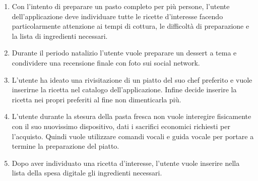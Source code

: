 \begin{enumerate}
\label{tasks}
\item Con l'intento di preparare un pasto completo per più persone,
l'utente dell'applicazione deve individuare tutte le ricette d'interesse
facendo particolarmente attenzione ai tempi di cottura, le difficoltà di
preparazione e la lista di ingredienti necessari.

\item Durante il periodo natalizio l'utente vuole preparare un dessert a tema
e condividere una recensione finale con foto sui social network.


\item L'utente ha ideato una rivisitazione di un piatto del suo chef
preferito e vuole inserirne la ricetta nel catalogo dell'applicazione.
Infine decide inserire la ricetta nei propri preferiti al fine non
dimenticarla più.

\item L'utente durante la stesura della pasta fresca non vuole
interegire fisicamente con il suo nuovissimo dispositivo, dati i
sacrifici economici richiesti per l'acquisto. Quindi vuole utilizzare
comandi vocali e guida vocale  per portare a termine la preparazione del
piatto.

\item Dopo aver individuato una ricetta d'interesse, l'utente vuole
inserire nella lista della spesa digitale gli ingredienti necessari.
\end{enumerate}

